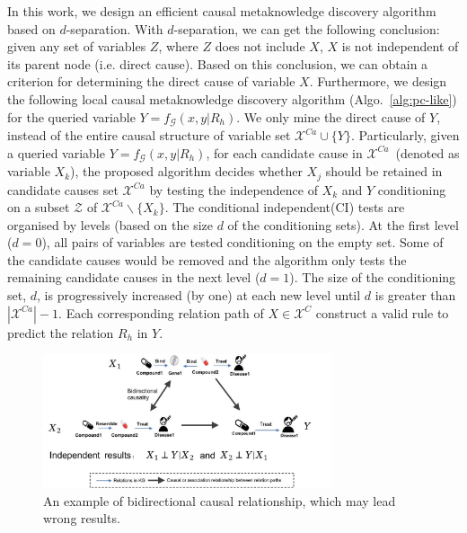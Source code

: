 In this work, we design an efficient causal metaknowledge discovery algorithm based on $d$-separation.
With $d$-separation, we can get the following conclusion: given any set of variables $Z$, where $Z$ does not include $X$, $X$ is not independent of its parent node ({i.e.} direct cause).
Based on this conclusion, we can obtain a criterion for determining the direct cause of variable $X$.
Furthermore, we design the following local causal metaknowledge discovery algorithm (Algo.~\ref{alg:pc-like}) for the queried variable $Y=f_{\mathcal{G}}(x,y|R_h)$.
We only mine the direct cause of $Y$, instead of the entire causal structure of variable set $\mathcal{X}^{Ca} \cup \{Y\}$.
Particularly, given a queried variable $Y=f_{\mathcal{G}}(x,y|R_h)$, for each candidate cause in $\mathcal{X}^{Ca}$~(denoted as variable $X_k$),
the proposed algorithm decides whether $X_j$ should be retained in candidate causes set $\mathcal{X}^{Ca}$ by testing the independence of $X_k$ and $Y$ conditioning on a subset $\mathcal{Z}$ of $\mathcal{X}^{Ca}\backslash \{X_k\}$.
The conditional independent(CI) tests are organised by levels (based on the size $d$ of the conditioning sets).
At the first level ($d = 0$), all pairs of variables are tested conditioning on the empty set.
Some of the candidate causes would be removed and the algorithm only tests the remaining candidate causes in the next level ($d = 1$).
The size of the conditioning set, $d$, is progressively increased (by one) at each new level until $d$ is greater than $|\mathcal{X}^{Ca}|-1$.
Each corresponding relation path of $X \in \mathcal{X}^C$ construct a valid rule to predict the relation $R_h$ in $Y$.

\begin{figure}[t]
\vspace{0cm}
\centering
\includegraphics[width=8.5cm]{submissions/causal-meta-knowledge/figures/bidirection.jpg}

\caption{An example of bidirectional causal relationship, which may lead wrong results.}
\label{fig:bidirection}

\end{figure}

